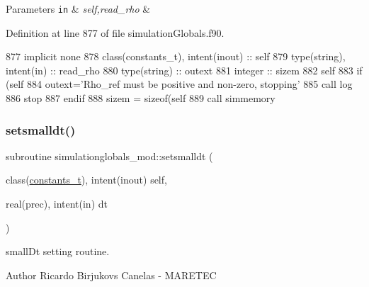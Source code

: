\begin{DoxyParams}[1]{Parameters}
\mbox{\tt in}  & {\em self,read\+\_\+rho} & \\
\hline
\end{DoxyParams}


Definition at line 877 of file simulation\+Globals.\+f90.


\begin{DoxyCode}
877     \textcolor{keywordtype}{implicit none}
878     \textcolor{keywordtype}{class}(constants\_t), \textcolor{keywordtype}{intent(inout)} :: self
879     \textcolor{keywordtype}{type}(string), \textcolor{keywordtype}{intent(in)} :: read\_rho
880     \textcolor{keywordtype}{type}(string) :: outext
881     \textcolor{keywordtype}{integer} :: sizem
882     self%
883     \textcolor{keywordflow}{if} (self%
884         outext=\textcolor{stringliteral}{'Rho\_ref must be positive and non-zero, stopping'}
885         \textcolor{keyword}{call }log%
886         stop
887 \textcolor{keywordflow}{    endif}
888     sizem = sizeof(self%
889     \textcolor{keyword}{call }simmemory%
\end{DoxyCode}
\mbox{\label{namespacesimulationglobals__mod_ad36c21a592a3230ce848804075abc97e}} 
\subsubsection{\texorpdfstring{setsmalldt()}{setsmalldt()}}
{\footnotesize\ttfamily subroutine simulationglobals\+\_\+mod\+::setsmalldt (\begin{DoxyParamCaption}\item[{class(\mbox{\hyperlink{structsimulationglobals__mod_1_1constants__t}{constants\+\_\+t}}), intent(inout)}]{self,  }\item[{real(prec), intent(in)}]{dt }\end{DoxyParamCaption})\hspace{0.3cm}{\ttfamily [private]}}



small\+Dt setting routine. 

\begin{DoxyAuthor}{Author}
Ricardo Birjukovs Canelas -\/ M\+A\+R\+E\+T\+EC 
\end{DoxyAuthor}

